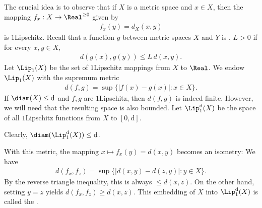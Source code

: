 \documentclass[letterpaper,10pt,english]{jupyterBook}
\begin{document}
\sphinxAtStartPar
The crucial idea is to observe that if \(X\) is a metric space and \(x \in X\), then the mapping \(f_{x}: X \to \Real^{\geq 0}\) given by
\begin{equation*}
\begin{split}
	f_{x}(y) = d_X(x,y)
\end{split}
\end{equation*}
\sphinxAtStartPar
is \(1\)\sphinxhyphen{}Lipschitz. Recall that a function \(g\) between metric spaces \(X\) and \(Y\)  is , \(L > 0\) if for every \(x,y \in X\),
\begin{equation*}
\begin{split}
	d(g(x),g(y)) \leq L \, d(x,y).
\end{split}
\end{equation*}
\sphinxAtStartPar
Let \(\Lip_1(X)\) be the set of \(1\)\sphinxhyphen{}Lipschitz mappings from \(X\) to \(\Real\). We endow \(\Lip_1(X)\) with the supremum metric
\begin{equation*}
\begin{split}
	d(f,g) = \sup \{|f(x) - g(x)| \colon x \in X \}.
\end{split}
\end{equation*}
\sphinxAtStartPar
If \(\diam(X) \leq \mathrm{d}\) and \(f,g\) are \(1\)\sphinxhyphen{}Lipschitz, then \(d(f,g)\) is indeed finite.
However, we will {\hyperref[\detokenize{Urysohn:ury-finishing-construction}]{}}  need that the resulting space is also bounded. Let  \(\Lip^{\mathrm{d}}_1(X)\) be the space of all \(1\)\sphinxhyphen{}Lipschitz functions from \(X\) to \([0,\mathrm{d}]\).

\sphinxAtStartPar
Clearly, \(\diam(\Lip^{\mathrm{d}}_1(X)) \leq \mathrm{d}\).

\sphinxAtStartPar
With this metric, the mapping \(x \mapsto f_{x}(y) = d(x,y) \) becomes an isometry: We have
\begin{equation*}
\begin{split}
	d(f_{x}, f_{z}) = \sup\{ | d(x,y) - d(z,y)| \colon y \in X \}.
\end{split}
\end{equation*}
\sphinxAtStartPar
By the reverse triangle inequality, this is always \(\leq d(x,z)\). On the other hand, setting \(y=z\) yields \(d(f_x,f_z) \geq d(x,z)\). This embedding of \(X\) into \(\Lip^{\mathrm{d}}_1(X)\) is called the .
\end{document}
